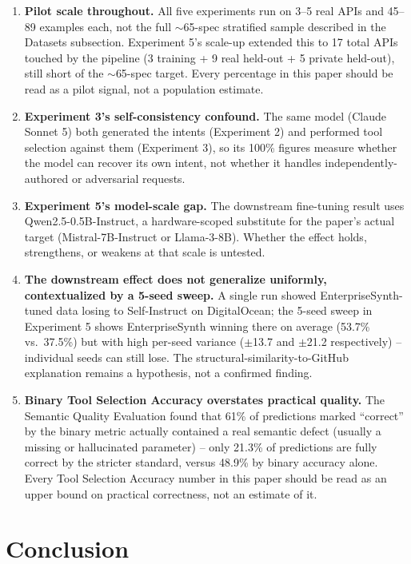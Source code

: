 \documentclass[11pt]{article}
\begin{document}
\begin{enumerate}
    \item \textbf{Pilot scale throughout.} All five experiments run on 3--5
    real APIs and 45--89 examples each, not the full $\sim$65-spec stratified sample described in
    the Datasets subsection. Experiment 5's scale-up extended this to 17 total APIs touched by the
    pipeline (3 training + 9 real held-out + 5 private held-out), still short of the $\sim$65-spec
    target. Every percentage in this paper should be read as a pilot signal, not a population
    estimate.
    \item \textbf{Experiment 3's self-consistency confound.} The same model (Claude Sonnet 5)
    both generated the intents (Experiment 2) and performed tool selection against them
    (Experiment 3), so its 100\% figures measure whether the model can recover its own intent,
    not whether it handles independently-authored or adversarial requests.
    \item \textbf{Experiment 5's model-scale gap.} The downstream fine-tuning result uses
    Qwen2.5-0.5B-Instruct, a hardware-scoped substitute for the paper's actual target
    (Mistral-7B-Instruct or Llama-3-8B). Whether the effect holds, strengthens, or weakens at that
    scale is untested.
    \item \textbf{The downstream effect does not generalize uniformly, contextualized by a 5-seed
    sweep.} A single run showed EnterpriseSynth-tuned data losing to Self-Instruct on
    DigitalOcean; the 5-seed sweep in Experiment 5 shows EnterpriseSynth winning there on average
    (53.7\% vs.\ 37.5\%) but with high per-seed variance ($\pm$13.7 and $\pm$21.2 respectively) --
    individual seeds can still lose. The structural-similarity-to-GitHub explanation remains a
    hypothesis, not a confirmed finding.
    \item \textbf{Binary Tool Selection Accuracy overstates practical quality.} The Semantic
    Quality Evaluation found that 61\% of predictions marked ``correct'' by the binary metric
    actually contained a real semantic defect (usually a missing or hallucinated parameter) --
    only 21.3\% of predictions are fully correct by the stricter standard, versus 48.9\% by binary
    accuracy alone. Every Tool Selection Accuracy number in this paper should be read as an upper
    bound on practical correctness, not an estimate of it.
\end{enumerate}

\section{Conclusion}
\end{document}
